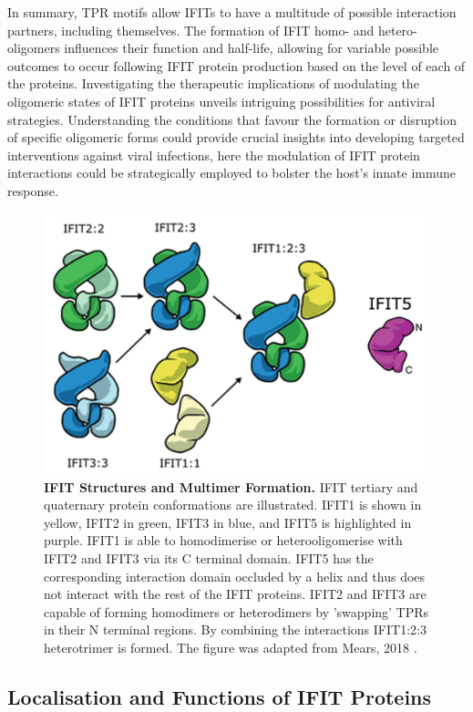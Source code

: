 In summary, TPR motifs allow IFITs to have a multitude of possible interaction partners, including themselves. The formation of IFIT homo- and hetero-oligomers influences their function and half-life, allowing for variable possible outcomes to occur following IFIT protein production based on the level of each of the proteins. Investigating the therapeutic implications of modulating the oligomeric states of IFIT proteins unveils intriguing possibilities for antiviral strategies. Understanding the conditions that favour the formation or disruption of specific oligomeric forms could provide crucial insights into developing targeted interventions against viral infections, here the modulation of IFIT protein interactions could be strategically employed to bolster the host's innate immune response.

\begin{figure}
    \centering
    \includegraphics[width=0.75\linewidth]{04. Introduction//Figs/05. IFIT-complexes.png}
    \caption[IFIT Structures and Multimer Formation.]{\textbf{IFIT Structures and Multimer Formation.} IFIT tertiary and quaternary protein conformations are illustrated. IFIT1 is shown in yellow, IFIT2 in green, IFIT3 in blue, and IFIT5 is highlighted in purple. IFIT1 is able to homodimerise or heterooligomerise with IFIT2 and IFIT3 via its C terminal domain. IFIT5 has the corresponding interaction domain occluded by a helix and thus does not interact with the rest of the IFIT proteins. IFIT2 and IFIT3 are capable of forming homodimers or heterodimers by 'swapping' TPRs in their N terminal regions. By combining the interactions IFIT1:2:3 heterotrimer is formed. The figure was adapted from Mears, 2018 \cite{Mears2018BetterResponse}.}
    \label{fig:IFIT Structures and Multimer Formation.}
\end{figure}

\subsection{Localisation and Functions of IFIT Proteins} \label{subsec:Localisation and Functions of IFIT Proteins}
